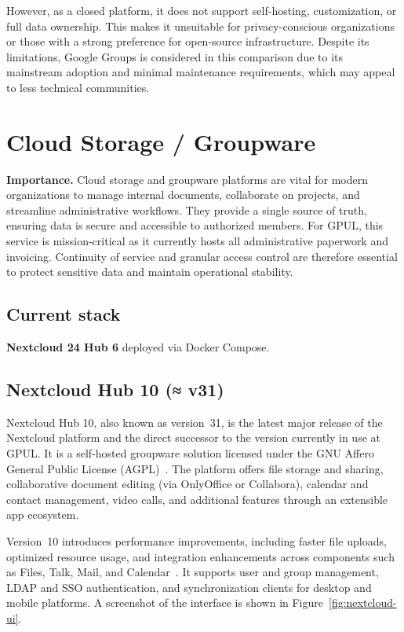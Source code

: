 However, as a closed platform, it does not support self-hosting, customization, or full data ownership. This makes it unsuitable for privacy-conscious organizations or those with a strong preference for open-source infrastructure. Despite its limitations, Google Groups is considered in this comparison due to its mainstream adoption and minimal maintenance requirements, which may appeal to less technical communities.

\section{Cloud Storage / Groupware}

\textbf{Importance.} Cloud storage and groupware platforms are vital for modern organizations to manage internal documents, collaborate on projects, and streamline administrative workflows. They provide a single source of truth, ensuring data is secure and accessible to authorized members. For GPUL, this service is mission-critical as it currently hosts all administrative paperwork and invoicing. Continuity of service and granular access control are therefore essential to protect sensitive data and maintain operational stability.

\subsection*{Current stack}
\textbf{Nextcloud 24 Hub 6} deployed via Docker Compose.

\subsection*{Nextcloud Hub 10 (≈ v31)}

Nextcloud Hub 10, also known as version~31, is the latest major release of the Nextcloud platform and the direct successor to the version currently in use at GPUL. It is a self-hosted groupware solution licensed under the GNU Affero General Public License (AGPL)~\cite{nextcloud-docs}. The platform offers file storage and sharing, collaborative document editing (via OnlyOffice or Collabora), calendar and contact management, video calls, and additional features through an extensible app ecosystem.

Version~10 introduces performance improvements, including faster file uploads, optimized resource usage, and integration enhancements across components such as Files, Talk, Mail, and Calendar~\cite{nextcloud-blog}. It supports user and group management, LDAP and SSO authentication, and synchronization clients for desktop and mobile platforms. A screenshot of the interface is shown in Figure~\ref{fig:nextcloud-ui}.

